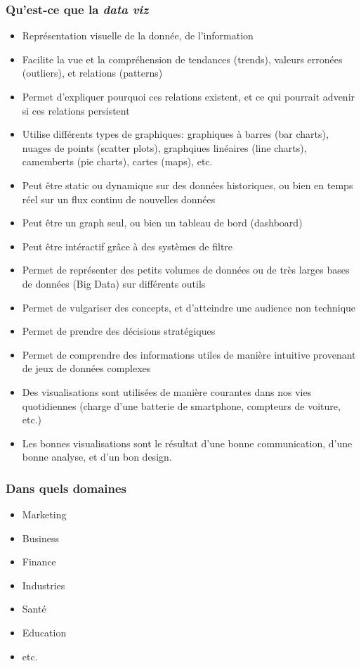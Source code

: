 \begin{frame}\frametitle{Qu'est-ce que la \textit{data viz}}
   \begin{itemize}
      \item Représentation visuelle de la donnée, de l'information
      \item Facilite la vue et la compréhension de tendances (trends), valeurs erronées (outliers), et relations (patterns)
      \item Permet d'expliquer pourquoi ces relations existent, et ce qui pourrait advenir si ces relations persistent
      
      \item Utilise différents types de graphiques: graphiques à barres (bar charts), nuages de points (scatter plots), graphqiues linéaires (line charts), camemberts (pie charts), cartes (maps), etc.
      
      \item Peut être static ou dynamique sur des données historiques, ou bien en temps réel sur un flux continu de nouvelles données
      \item Peut être un graph seul, ou bien un tableau de bord (dashboard)
      \item Peut être intéractif grâce à des systèmes de filtre
      
      \item Permet de représenter des petits volumes de données ou de très larges bases de données (Big Data) sur différents outils
      \item Permet de vulgariser des concepts, et d'atteindre une audience non technique
      \item Permet de prendre des décisions stratégiques
      \item Permet de comprendre des informations utiles de manière intuitive provenant de jeux de données complexes

      \item Des visualisations sont utilisées de manière courantes dans nos vies quotidiennes (charge d'une batterie de smartphone, compteurs de voiture, etc.)
      \item Les bonnes visualisations sont le résultat d'une bonne communication, d'une bonne analyse, et d'un bon design.
      
   \end{itemize}
\end{frame}

\begin{frame}\frametitle{Dans quels domaines}
   \begin{itemize}
      \item Marketing
      \item Business
      \item Finance
      \item Industries
      \item Santé
      \item Education
      \item etc.
   \end{itemize}
\end{frame}

